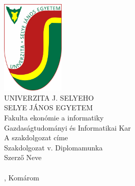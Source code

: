 \documentclass[a4paper,oneside,onecolumn,12pt]{LegrandOrangeBook}
\begin{document}
\thispagestyle{empty}
\begin{minipage}[c][\textheight][c]{\textwidth}
	{\centering
	\includegraphics[keepaspectratio,width=3cm]{SelyeBanner.png}\\
	\vskip0.5cm
	{\LARGE UNIVERZITA J. SELYEHO}\\
	\vskip0.5cm
	{\LARGE SELYE JÁNOS EGYETEM}\\
    \vskip0.5cm
	{\large Fakulta ekonómie a informatiky}\\
	\vskip0.5cm
	{\large Gazdaságtudományi és Informatikai Kar}\\
	\vfill
	{\Huge A szakdolgozat címe}\\
	Szakdolgozat v. Diplomamunka\\
	Szerző Neve \\
    \ISBN\\
	\hfill\the\year{}, Komárom\hfill
	}
\end{minipage}
\end{document}
